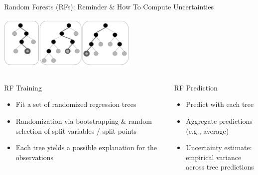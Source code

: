 \begin{frame}[c]{Random Forests (RFs): Reminder \& How To Compute Uncertainties}

\centering
    \includegraphics[width=0.5\textwidth]{images/surrogate_models/random_forest_pic}

\begin{columns}[T] %
\begin{column}{.48\textwidth}

\begin{block}{RF Training}
\begin{itemize}
	\item Fit a set of \alert{randomized} regression trees
	\item Randomization via bootstrapping \& random selection of split variables / split points
	\item Each tree yields a possible explanation for the observations
\end{itemize}
\end{block}
\end{column}

\fhpause
\hfill

\begin{column}{.48\textwidth}
    \begin{block}{RF Prediction}
    \begin{itemize}
    	\item Predict with each tree
    	\item Aggregate predictions (e.g., average)
    	\item Uncertainty estimate:\\ \alert{empirical variance across tree predictions}
    \end{itemize}
    \end{block}
\end{column}
\end{columns}

\end{frame}
